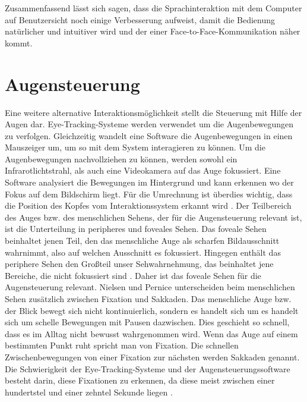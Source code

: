 Zusammenfassend lässt sich sagen, dass die Sprachinteraktion mit dem Computer auf Benutzersicht noch einige Verbesserung aufweist, damit die Bedienung natürlicher und intuitiver wird und der einer Face-to-Face-Kommunikation näher kommt.

\section{Augensteuerung}
\label{cha:Augensteuerung}

Eine weitere alternative Interaktionsmöglichkeit stellt die Steuerung mit Hilfe der Augen dar. Eye-Tracking-Systeme werden verwendet um die Augenbewegungen zu verfolgen. Gleichzeitig wandelt eine Software die Augenbewegungen in einen Mauszeiger um, um so mit dem System interagieren zu können. 
\newline \newline
Um die Augenbewegungen nachvollziehen zu können, werden sowohl ein Infrarotlichtstrahl, als auch eine Videokamera auf das Auge fokussiert. Eine Software analysiert die Bewegungen im Hintergrund und kann erkennen wo der Fokus auf dem Bildschirm liegt. Für die Umrechnung ist überdies wichtig, dass die Position des Kopfes vom Interaktionssystem erkannt wird \cite{NielsenPernice}.
\newline \newline
Der Teilbereich des Auges bzw. des menschlichen Sehens, der für die Augensteuerung relevant ist, ist die Unterteilung in peripheres und foveales Sehen. Das foveale Sehen beinhaltet jenen Teil, den das menschliche Auge als scharfen Bildausschnitt wahrnimmt, also auf welchen Ausschnitt es fokussiert. Hingegen enthält das periphere Sehen den Großteil unser Sehwahrnehmung, das beinhaltet jene Bereiche, die nicht fokussiert sind \cite{NielsenPernice}. Daher ist das foveale Sehen für die Augensteuerung relevant.
\newline \newline
Nielsen und Pernice \cite{NielsenPernice} unterscheiden beim menschlichen Sehen zusätzlich zwischen Fixation und Sakkaden. Das menschliche Auge bzw. der Blick bewegt sich nicht kontinuierlich, sondern es handelt sich um es handelt sich um schelle Bewegungen mit Pausen dazwischen. Dies geschieht so schnell, dass es im Alltag nicht bewusst wahrgenommen wird. Wenn das Auge auf einem bestimmten Punkt ruht spricht man von Fixation. Die schnellen Zwischenbewegungen von einer Fixation zur nächsten werden Sakkaden genannt. Die Schwierigkeit der Eye-Tracking-Systeme und der Augensteuerungssoftware besteht darin, diese Fixationen zu erkennen, da diese meist zwischen einer hundertstel und einer zehntel Sekunde liegen \cite{NielsenPernice}.
